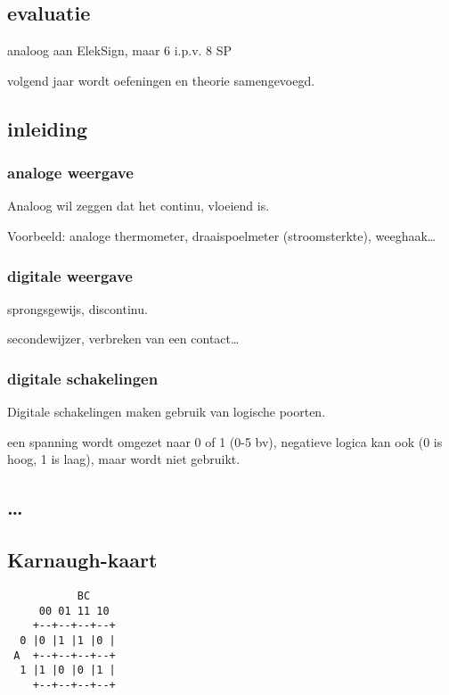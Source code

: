 \documentclass[11pt, a4paper]{article}
\begin{document}
\subsection{evaluatie}

analoog aan ElekSign, maar 6 i.p.v. 8 SP

volgend jaar wordt oefeningen en theorie samengevoegd.

\subsection{inleiding}

\subsubsection{analoge weergave}

Analoog wil zeggen dat het continu, vloeiend is.

Voorbeeld: analoge thermometer, draaispoelmeter (stroomsterkte), weeghaak\dots

\subsubsection{digitale weergave}

sprongsgewijs, discontinu.

secondewijzer, verbreken van een contact\dots

\subsubsection{digitale schakelingen}

Digitale schakelingen maken gebruik van logische poorten.

een spanning wordt omgezet naar 0 of 1 (0-5 bv), negatieve logica kan ook (0 is hoog, 1 is laag), maar wordt niet gebruikt.

\subsection{\dots}

\subsection{Karnaugh-kaart}


\begin{verbatim}
    	   BC
     00 01 11 10
    +--+--+--+--+
  0 |0 |1 |1 |0 |
 A  +--+--+--+--+
  1 |1 |0 |0 |1 |
    +--+--+--+--+
\end{verbatim}
\end{document}
